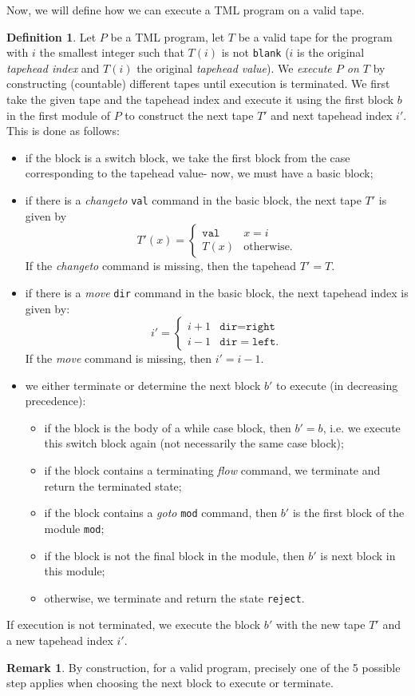\documentclass{article}
\theoremstyle{definition}
\newtheorem{definition}[rules]{Definition}
\newtheorem{remark}[rules]{Remark}
\begin{document}
    Now, we will define how we can execute a TML program on a valid tape.
    \begin{definition}
        Let $P$ be a TML program, let $T$ be a valid tape for the program with $i$ the smallest integer such that $T(i)$ is not \texttt{blank} ($i$ is the original \emph{tapehead index} and $T(i)$ the original \textit{tapehead value}). We \emph{execute $P$ on $T$} by constructing (countable) different tapes until execution is terminated. We first take the given tape and the tapehead index and execute it using the first block $b$ in the first module of $P$ to construct the next tape $T'$ and next tapehead index $i'$. This is done as follows:
        \begin{itemize}
            \item if the block is a switch block, we take the first block from the case corresponding to the tapehead value- now, we must have a basic block;
            \item if there is a \textit{changeto} \texttt{val} command in the basic block, the next tape $T'$ is given by 
            \[T'(x) = \begin{cases}
                \texttt{val} & x = i \\
                T(x) & \text{otherwise}.
            \end{cases}\]
            If the \textit{changeto} command is missing, then the tapehead $T' = T$.
            \item if there is a \textit{move} \texttt{dir} command in the basic block, the next tapehead index is given by:
            \[i' = \begin{cases}
                i+1 & \texttt{dir} = \texttt{right} \\
                i-1 & \texttt{dir} = \texttt{left}.
            \end{cases}\]
            If the \textit{move} command is missing, then $i' = i-1$.
            \item we either terminate or determine the next block $b'$ to execute (in decreasing precedence):
            \begin{itemize}
                \item if the block is the body of a while case block, then $b' = b$, i.e. we execute this switch block again (not necessarily the same case block); 
                \item if the block contains a terminating \textit{flow} command, we terminate and return the terminated state;
                \item if the block contains a \textit{goto} \texttt{mod} command, then $b'$ is the first block of the module \texttt{mod};
                \item if the block is not the final block in the module, then $b'$ is next block in this module;
                \item otherwise, we terminate and return the state \texttt{reject}.
            \end{itemize}
        \end{itemize}
        If execution is not terminated, we execute the block $b'$ with the new tape $T'$ and a new tapehead index $i'$.
    \end{definition}
    \begin{remark}
        By construction, for a valid program, precisely one of the 5 possible step applies when choosing the next block to execute or terminate.
    \end{remark}
\end{document}
